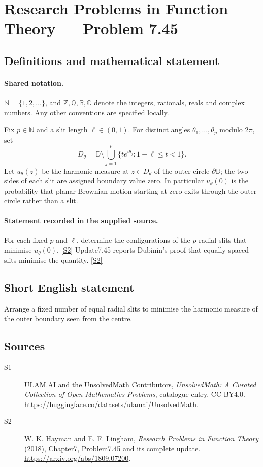 \documentclass[11pt]{article}
\newcommand{\sref}[2]{\hyperlink{source:#1:#2}{[S#2]}}
\begin{document}
\section{Research Problems in Function Theory — Problem 7.45}\label{statement}

\subsection{Definitions and mathematical statement}

\paragraph{Shared notation.}$\mathbb N=\{1,2,\ldots\}$, and $\mathbb Z,\mathbb Q,\mathbb R,\mathbb C$ denote the integers, rationals, reals and complex numbers. Any other conventions are specified locally.


Fix $p\in\mathbb N$ and a slit length $\ell\in(0,1)$. For distinct angles $\theta_1,\ldots,\theta_p$ modulo $2\pi$, set
\[D_\theta=\mathbb D\setminus\bigcup_{j=1}^p\{te^{i\theta_j}:1-\ell\le t<1\}.\]
Let $u_\theta(z)$ be the harmonic measure at $z\in D_\theta$ of the outer circle $\partial\mathbb D$; the two sides of each slit are assigned boundary value zero. In particular $u_\theta(0)$ is the probability that planar Brownian motion starting at zero exits through the outer circle rather than a slit.

\paragraph{Statement recorded in the supplied source.}
For each fixed $p$ and $\ell$, determine the configurations of the $p$ radial slits that minimise $u_\theta(0)$. \sref{statement}{2}
Update7.45 reports Dubinin's proof that equally spaced slits minimise the quantity. \sref{statement}{2}
\subsection{Short English statement}
Arrange a fixed number of equal radial slits to minimise the harmonic measure of the outer boundary seen from the centre.
\subsection{Sources}
\begin{description}
\item[\hypertarget{source:statement:1}{S1}] ULAM.AI and the UnsolvedMath Contributors, \emph{UnsolvedMath: A Curated Collection of Open Mathematics Problems}, catalogue entry. CC BY4.0. \url{https://huggingface.co/datasets/ulamai/UnsolvedMath}.
\item[\hypertarget{source:statement:2}{S2}] W. K. Hayman and E. F. Lingham, \emph{Research Problems in Function Theory} (2018), Chapter7, Problem7.45 and its complete update. \url{https://arxiv.org/abs/1809.07200}.
\end{description}
\label{end:statement}
\end{document}
